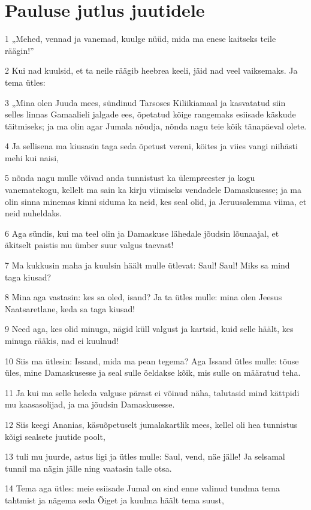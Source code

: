 \section*{Pauluse jutlus juutidele}

\par 1 „Mehed, vennad ja vanemad, kuulge nüüd, mida ma enese kaitseks teile räägin!”
\par 2 Kui nad kuulsid, et ta neile räägib heebrea keeli, jäid nad veel vaiksemaks. Ja tema ütles:
\par 3 „Mina olen Juuda mees, sündinud Tarsoses Kiliikiamaal ja kasvatatud siin selles linnas Gamaalieli jalgade ees, õpetatud kõige rangemaks esiisade käskude täitmiseks; ja ma olin agar Jumala nõudja, nõnda nagu teie kõik tänapäeval olete.
\par 4 Ja sellisena ma kiusasin taga seda õpetust vereni, köites ja viies vangi niihästi mehi kui naisi,
\par 5 nõnda nagu mulle võivad anda tunnistust ka ülempreester ja kogu vanematekogu, kellelt ma sain ka kirju viimiseks vendadele Damaskusesse; ja ma olin sinna minemas kinni siduma ka neid, kes seal olid, ja Jeruusalemma viima, et neid nuheldaks.
\par 6 Aga sündis, kui ma teel olin ja Damaskuse lähedale jõudsin lõunaajal, et äkitselt paistis mu ümber suur valgus taevast!
\par 7 Ma kukkusin maha ja kuulsin häält mulle ütlevat: Saul! Saul! Miks sa mind taga kiusad?
\par 8 Mina aga vastasin: kes sa oled, isand? Ja ta ütles mulle: mina olen Jeesus Naatsaretlane, keda sa taga kiusad!
\par 9 Need aga, kes olid minuga, nägid küll valgust ja kartsid, kuid selle häält, kes minuga rääkis, nad ei kuulnud!
\par 10 Siis ma ütlesin: Issand, mida ma pean tegema? Aga Issand ütles mulle: tõuse üles, mine Damaskusesse ja seal sulle öeldakse kõik, mis sulle on määratud teha.
\par 11 Ja kui ma selle heleda valguse pärast ei võinud näha, talutasid mind kättpidi mu kaasasolijad, ja ma jõudsin Damaskusesse.
\par 12 Siis keegi Ananias, käsuõpetuselt jumalakartlik mees, kellel oli hea tunnistus kõigi sealsete juutide poolt,
\par 13 tuli mu juurde, astus ligi ja ütles mulle: Saul, vend, näe jälle! Ja selsamal tunnil ma nägin jälle ning vaatasin talle otsa.
\par 14 Tema aga ütles: meie esiisade Jumal on sind enne valinud tundma tema tahtmist ja nägema seda Õiget ja kuulma häält tema suust,

